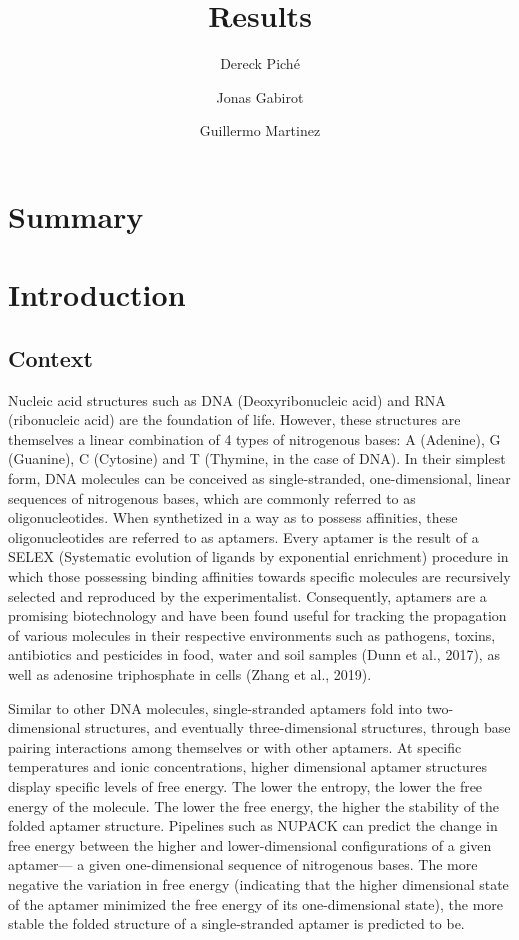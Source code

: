 \documentclass{article}
\title{Results}
\author
{
    Dereck Piché \and
    Jonas Gabirot \and
    Guillermo Martinez\and
}
\begin{document}
\maketitle
\section{Summary}
\section{Introduction}
\subsection{Context}
Nucleic acid structures such as DNA (Deoxyribonucleic acid) and RNA (ribonucleic acid) are the foundation of life.
However, these structures are themselves a linear combination of 4 types of nitrogenous bases: A (Adenine), G (Guanine), C (Cytosine) and T (Thymine, in the case of DNA).
In their simplest form, DNA molecules can be conceived as single-stranded, one-dimensional, linear sequences of nitrogenous bases, which are commonly referred to as oligonucleotides.
When synthetized in a way as to possess affinities, these oligonucleotides are referred to as aptamers.
Every aptamer is the result of a SELEX (Systematic evolution of ligands by exponential enrichment) procedure in which those possessing binding affinities towards specific molecules are recursively selected and reproduced by the experimentalist.
Consequently,  aptamers are a promising biotechnology and have been found useful for tracking the propagation of various molecules in their respective environments such as pathogens, toxins, antibiotics and pesticides in food, water and soil samples (Dunn et al., 2017), as well as adenosine triphosphate in cells (Zhang et al., 2019).

Similar to other DNA molecules, single-stranded aptamers fold into two-dimensional structures, and eventually three-dimensional structures, through base pairing interactions among themselves or with other aptamers.
At specific temperatures and ionic concentrations, higher dimensional aptamer structures display specific levels of free energy. The lower the entropy, the lower the free energy of the molecule.
The lower the free energy, the higher the stability of the folded aptamer structure. Pipelines such as NUPACK can predict the change in free energy between the higher and lower-dimensional configurations of a given aptamer— a given one-dimensional sequence of nitrogenous bases.
The more negative the variation in free energy (indicating that the higher dimensional state of the aptamer minimized the free energy of its one-dimensional state), the more stable the folded structure of a single-stranded aptamer is predicted to be.
\end{document}
